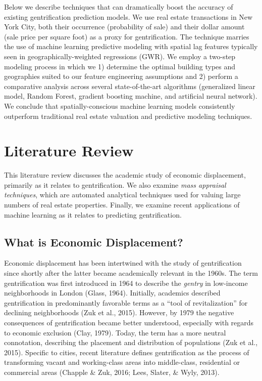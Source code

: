 \documentclass[12pt,]{article}
\begin{document}
Below we describe techniques that can dramatically boost the accuracy of
existing gentrification prediction models. We use real estate
transactions in New York City, both their occurrence (probability of
sale) and their dollar amount (sale price per square foot) as a proxy
for gentrification. The technique marries the use of machine learning
predictive modeling with spatial lag features typically seen in
geographically-weighted regressions (GWR). We employ a two-step modeling
process in which we 1) determine the optimal building types and
geographies suited to our feature engineering assumptions and 2) perform
a comparative analysis across several state-of-the-art algorithms
(generalized linear model, Random Forest, gradient boosting machine, and
artificial neural network). We conclude that spatially-conscious machine
learning models consistently outperform traditional real estate
valuation and predictive modeling techniques.

\hypertarget{literature-review}{%
\section{Literature Review}\label{literature-review}}

This literature review discusses the academic study of economic
displacement, primarily as it relates to gentrification. We also examine
\emph{mass appraisal techniques}, which are automated analytical
techniques used for valuing large numbers of real estate properties.
Finally, we examine recent applications of machine learning as it
relates to predicting gentrification.

\hypertarget{what-is-economic-displacement}{%
\subsection{What is Economic
Displacement?}\label{what-is-economic-displacement}}

Economic displacement has been intertwined with the study of
gentrification since shortly after the latter became academically
relevant in the 1960s. The term gentrification was first introduced in
1964 to describe the \emph{gentry} in low-income neighborhoods in London
(Glass, 1964). Initially, academics described gentrification in
predominantly favorable terms as a ``tool of revitalization'' for
declining neighborhoods (Zuk et al., 2015). However, by 1979 the
negative consequences of gentrification became better understood,
especially with regards to economic exclusion (Clay, 1979). Today, the
term has a more neutral connotation, describing the placement and
distribution of populations (Zuk et al., 2015). Specific to cities,
recent literature defines gentrification as the process of transforming
vacant and working-class areas into middle-class, residential or
commercial areas (Chapple \& Zuk, 2016; Lees, Slater, \& Wyly, 2013).
\end{document}
